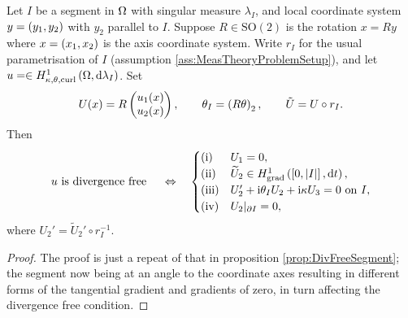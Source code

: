 \begin{cory} \label{cory:DivFreeRotated}
	Let $I$ be a segment in $\Omega$ with singular measure $\lambda_I$, and local coordinate system $y=\left( y_1, y_2 \right)$ with $y_2$ parallel to $I$.
	Suppose $R\in\mathrm{SO}(2)$ is the rotation $x=Ry$ where $x=\left( x_1, x_2 \right)$ is the axis coordinate system.
	Write $r_I$ for the usual parametrisation of $I$ (assumption \ref{ass:MeasTheoryProblemSetup}), and let $u=\in H^1_{\kappa,\theta,\mathrm{curl}}\left( \Omega, \mathrm{d}\lambda_I \right)$.
	Set
	\begin{align*}
		U(x) = R \begin{pmatrix} u_1(x) \\ u_2(x) \end{pmatrix}, 
		\qquad \theta_I = \left(  R\theta  \right)_2,
		\qquad \tilde{U} = U \circ r_I.
	\end{align*}
	Then
	\begin{align*}
		u \text{ is divergence free } \quad\Leftrightarrow\quad
		\begin{cases}
			\mathrm{(i)} & U_1 = 0, \\
			\mathrm{(ii)} & \widetilde{U}_2 \in H^1_\mathrm{grad}\left( \left[ 0,\left\lvert I \right\rvert \right], \mathrm{d}t \right), \\
			\mathrm{(iii)} & U_2' + \mathrm{i}\theta_I U_2 + \mathrm{i}\kappa U_3 = 0 \text{ on } I, \\
			\mathrm{(iv)} & U_2\vert_{\partial I} = 0,
		\end{cases}
	\end{align*}
	where $U_2' = \widetilde{U}_2'\circ r_I^{-1}$.
\end{cory}
\begin{proof}
	The proof is just a repeat of that in proposition \ref{prop:DivFreeSegment}; the segment now being at an angle to the coordinate axes resulting in different forms of the tangential gradient and gradients of zero, in turn affecting the divergence free condition.
\end{proof}

